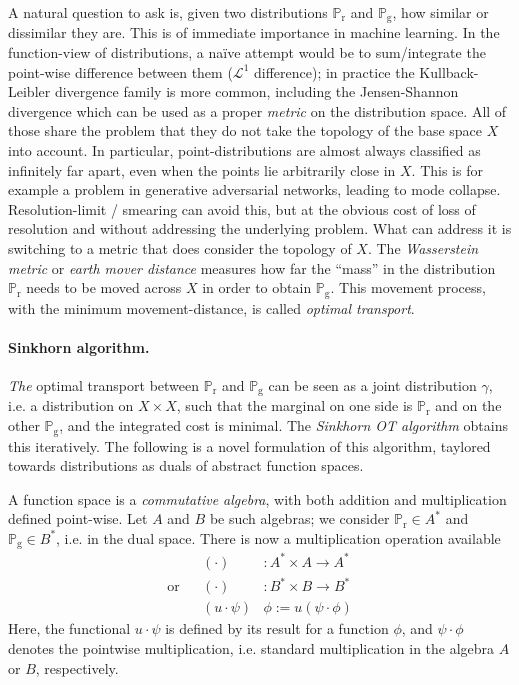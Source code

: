 \documentclass[a4paper]{easychair}
\begin{document}
\newcommand{\marg}[1]{\mathbb{P}_\mathrm{#1}}
A natural question to ask is, given two distributions $\marg r$ and $\marg g$, how similar or dissimilar they are. This is of immediate importance in machine learning. In the function-view of distributions, a naïve attempt would be to sum/integrate the point-wise difference between them ($\mathcal{L}^1$ difference); in practice the Kullback-Leibler \cite{Kullback_1951} divergence family is more common, including the Jensen-Shannon divergence which can be used as a proper \emph{metric} on the distribution space.
 All of those share the problem that they do not take the topology of the base space $X$ into account. In particular, point-distributions are almost always classified as infinitely far apart, even when the points lie arbitrarily close in $X$. This is for example a problem in generative adversarial networks, leading to mode collapse. Resolution-limit / smearing can avoid this, but at the obvious cost of loss of resolution and without addressing the underlying problem.
What can address it \cite{pmlr-v70-arjovsky17a} is switching to a metric that does consider the topology of $X$. The \emph{Wasserstein metric} or \emph{earth mover distance} measures how far the “mass” in the distribution $\marg r$ needs to be moved across $X$ in order to obtain $\marg g$. This movement process, with the minimum movement-distance, is called \emph{optimal transport}.

\paragraph{Sinkhorn algorithm.} \emph{The} optimal transport between $\marg r$ and $\marg g$ can be seen as a joint distribution $\gamma$, i.e. a distribution on $X\times X$, such that the marginal on one side is $\marg r$ and on the other $\marg g$, and the integrated cost is minimal.
The \emph{Sinkhorn OT algorithm} \cite{CuturiSinkhornLightspeed} obtains this iteratively. The following is a novel formulation of this algorithm, taylored towards distributions as duals of abstract function spaces.

A function space is a \emph{commutative algebra}, with both addition and multiplication defined point-wise. Let $A$ and $B$ be such algebras; we consider $\marg r \in A^\ast$ and $\marg g \in B^\ast$, i.e. in the dual space. There is now a multiplication operation available
\[\begin{aligned}
            && (\cdot) &: A^\ast \times A \to A^\ast
 \\\text{or}&& (\cdot) &: B^\ast \times B \to B^\ast
 \\         && (u\cdot\psi)& \phi := u(\psi\cdot\phi)
\end{aligned}\]
Here, the functional $u\cdot\psi$ is defined by its result for a function $\phi$, and $\psi\cdot\phi$ denotes the pointwise multiplication, i.e. standard multiplication in the algebra $A$ or $B$, respectively.
\end{document}
